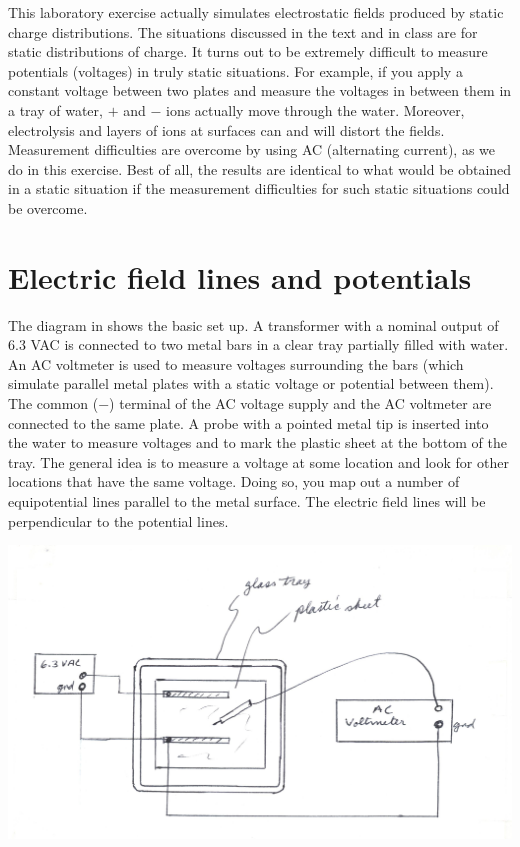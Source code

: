 \begin{multicols}{2}
This laboratory exercise actually simulates electrostatic fields produced by static charge distributions.  The situations discussed in the text and in class are for static distributions of charge.  It turns out to be extremely difficult to measure potentials (voltages) in truly static situations.  For example, if you apply a constant voltage between two plates and measure the voltages in between them in a tray of water, $+$ and $-$ ions actually move through the water.  Moreover, electrolysis and layers of ions at surfaces can and will distort the fields.  Measurement difficulties are overcome by using AC (alternating current), as we do in this exercise.  Best of all, the results are identical to what would be obtained in a static situation if the measurement difficulties for such static situations could be overcome.

\section{Electric field lines and potentials}
The diagram in  shows the basic set up.  A transformer with a nominal output of 6.3 VAC is connected to two metal bars in a clear tray partially filled with water.  An AC voltmeter is used to measure voltages surrounding the bars (which simulate parallel metal plates with a static voltage or potential between them).  The common ($-$) terminal of the AC voltage supply and the AC voltmeter are connected to the same plate.  A probe with a pointed metal tip is inserted into the water to measure voltages and to mark the plastic sheet at the bottom of the tray.  The general idea is to measure a voltage at some location and look for other locations that have the same voltage.  Doing so, you map out a number of equipotential lines parallel to the metal surface. The electric field lines will be perpendicular to the potential lines.

\begin{center}
	\includegraphics[scale=0.6]{5bgraf/fig_1}
	\label{f:fig1}
\end{center}


\end{multicols}
